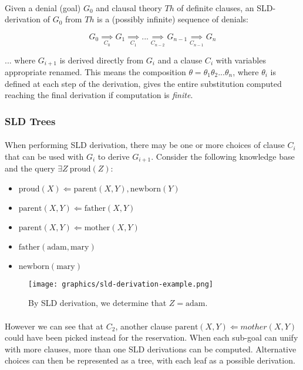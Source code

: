 \documentclass{article}
\theoremstyle{plain}
\theoremstyle{definition}
\begin{document}
\begin{multicols}{2}
\paragraph{} Given a denial (goal) $G_0$ and clausal theory $Th$ of definite clauses, an SLD-derivation of $G_0$ from $Th$ is a (possibly infinite) sequence of denials:

$$G_0 \underset{C_0}{\implies} G_1 \underset{C_1}{\implies} ...  \underset{C_{n-2}}{\implies} G_{n - 1}\underset{C_{n - 1}}{\implies} G_n  $$

\noindent ... where $G_{i + 1}$ is derived directly from $G_i$ and a clause $C_i$ with variables appropriate renamed. This means the composition $\theta = \theta_1 \theta_2 ... \theta_n$, where $\theta_i$ is defined at each step of the derivation, gives the entire substitution computed reaching the final derivation if computation is \textit{finite}.

\subsubsection{SLD Trees}

\paragraph{} When performing SLD derivation, there may be one or more choices of clause $C_i$ that can be used with $G_i$ to derive $G_{i+1}$. Consider the following knowledge base and the query $\exists Z\ \text{proud}(Z)$:

\begin{itemize}
\setlength\itemsep{0.0em}
\item[] $\text{proud}(X) \Leftarrow \text{parent}(X, Y), \text{newborn}(Y)$
\item[] $\text{parent}(X, Y) \Leftarrow \text{father}(X, Y)$
\item[] $\text{parent}(X, Y) \Leftarrow \text{mother}(X, Y)$
\item[] $\text{father}(\text{adam}, \text{mary})$
\item[] $\text{newborn}(\text{mary})$
\end{itemize}


\begin{figure}[H]
\centering
\texttt{[image: graphics/sld-derivation-example.png]}
\caption{By SLD derivation, we determine that $Z = \text{adam}$.}
\end{figure}

\paragraph{} However we can see that at $C_2$, another clause $\text{parent}(X, Y) \Leftarrow mother(X, Y)$ could have been picked instead for the reservation. When each sub-goal can unify with more clauses, more than one SLD derivations can be computed. Alternative choices can then be represented as a tree, with each leaf as a possible derivation.


\end{multicols}
\end{document}
